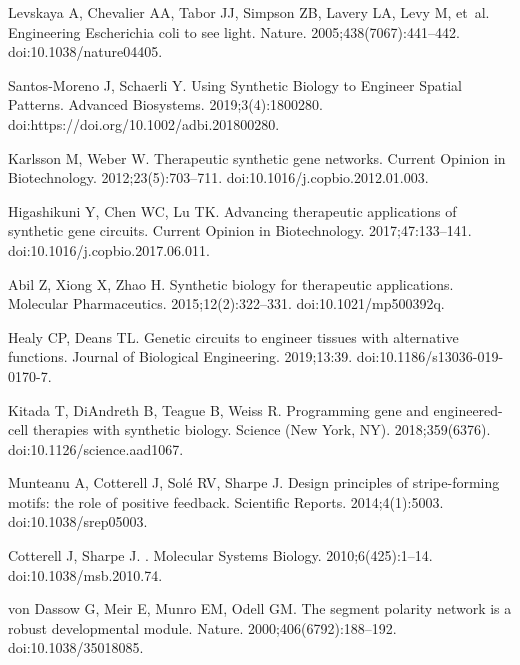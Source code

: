 \documentclass[10pt,letterpaper]{article}
\begin{document}
\begin{thebibliography}{10}
Levskaya A, Chevalier AA, Tabor JJ, Simpson ZB, Lavery LA, Levy M, et~al.
\newblock Engineering {Escherichia} coli to see light.
\newblock Nature. 2005;438(7067):441--442.
\newblock doi:{10.1038/nature04405}.

Santos-Moreno J, Schaerli Y.
\newblock Using {Synthetic} {Biology} to {Engineer} {Spatial} {Patterns}.
\newblock Advanced Biosystems. 2019;3(4):1800280.
\newblock doi:{https://doi.org/10.1002/adbi.201800280}.

Karlsson M, Weber W.
\newblock Therapeutic synthetic gene networks.
\newblock Current Opinion in Biotechnology. 2012;23(5):703--711.
\newblock doi:{10.1016/j.copbio.2012.01.003}.

Higashikuni Y, Chen WC, Lu TK.
\newblock Advancing therapeutic applications of synthetic gene circuits.
\newblock Current Opinion in Biotechnology. 2017;47:133--141.
\newblock doi:{10.1016/j.copbio.2017.06.011}.

Abil Z, Xiong X, Zhao H.
\newblock Synthetic biology for therapeutic applications.
\newblock Molecular Pharmaceutics. 2015;12(2):322--331.
\newblock doi:{10.1021/mp500392q}.

Healy CP, Deans TL.
\newblock Genetic circuits to engineer tissues with alternative functions.
\newblock Journal of Biological Engineering. 2019;13:39.
\newblock doi:{10.1186/s13036-019-0170-7}.

Kitada T, DiAndreth B, Teague B, Weiss R.
\newblock Programming gene and engineered-cell therapies with synthetic
  biology.
\newblock Science (New York, NY). 2018;359(6376).
\newblock doi:{10.1126/science.aad1067}.

Munteanu A, Cotterell J, Solé RV, Sharpe J.
\newblock Design principles of stripe-forming motifs: the role of positive
  feedback.
\newblock Scientific Reports. 2014;4(1):5003.
\newblock doi:{10.1038/srep05003}.

Cotterell J, Sharpe J.
.
\newblock Molecular Systems Biology. 2010;6(425):1--14.
\newblock doi:{10.1038/msb.2010.74}.

von Dassow G, Meir E, Munro EM, Odell GM.
\newblock The segment polarity network is a robust developmental module.
\newblock Nature. 2000;406(6792):188--192.
\newblock doi:{10.1038/35018085}.


\end{thebibliography}
\end{document}
